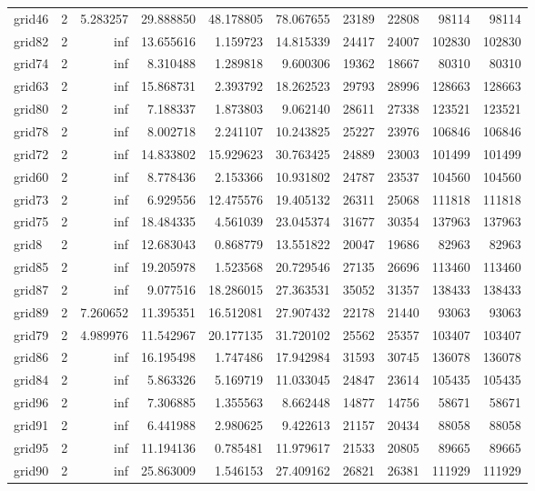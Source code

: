 \begin{longtable}{|l|r|r|r|r|r|r|r|r|r|}
grid46 & 2 & 5.283257 & 29.888850 & 48.178805 & 78.067655 & 23189 & 22808 & 98114 & 98114 \\
grid82 & 2 & inf & 13.655616 & 1.159723 & 14.815339 & 24417 & 24007 & 102830 & 102830 \\
grid74 & 2 & inf & 8.310488 & 1.289818 & 9.600306 & 19362 & 18667 & 80310 & 80310 \\
grid63 & 2 & inf & 15.868731 & 2.393792 & 18.262523 & 29793 & 28996 & 128663 & 128663 \\
grid80 & 2 & inf & 7.188337 & 1.873803 & 9.062140 & 28611 & 27338 & 123521 & 123521 \\
grid78 & 2 & inf & 8.002718 & 2.241107 & 10.243825 & 25227 & 23976 & 106846 & 106846 \\
grid72 & 2 & inf & 14.833802 & 15.929623 & 30.763425 & 24889 & 23003 & 101499 & 101499 \\
grid60 & 2 & inf & 8.778436 & 2.153366 & 10.931802 & 24787 & 23537 & 104560 & 104560 \\
grid73 & 2 & inf & 6.929556 & 12.475576 & 19.405132 & 26311 & 25068 & 111818 & 111818 \\
grid75 & 2 & inf & 18.484335 & 4.561039 & 23.045374 & 31677 & 30354 & 137963 & 137963 \\
grid8 & 2 & inf & 12.683043 & 0.868779 & 13.551822 & 20047 & 19686 & 82963 & 82963 \\
grid85 & 2 & inf & 19.205978 & 1.523568 & 20.729546 & 27135 & 26696 & 113460 & 113460 \\
grid87 & 2 & inf & 9.077516 & 18.286015 & 27.363531 & 35052 & 31357 & 138433 & 138433 \\
grid89 & 2 & 7.260652 & 11.395351 & 16.512081 & 27.907432 & 22178 & 21440 & 93063 & 93063 \\
grid79 & 2 & 4.989976 & 11.542967 & 20.177135 & 31.720102 & 25562 & 25357 & 103407 & 103407 \\
grid86 & 2 & inf & 16.195498 & 1.747486 & 17.942984 & 31593 & 30745 & 136078 & 136078 \\
grid84 & 2 & inf & 5.863326 & 5.169719 & 11.033045 & 24847 & 23614 & 105435 & 105435 \\
grid96 & 2 & inf & 7.306885 & 1.355563 & 8.662448 & 14877 & 14756 & 58671 & 58671 \\
grid91 & 2 & inf & 6.441988 & 2.980625 & 9.422613 & 21157 & 20434 & 88058 & 88058 \\
grid95 & 2 & inf & 11.194136 & 0.785481 & 11.979617 & 21533 & 20805 & 89665 & 89665 \\
grid90 & 2 & inf & 25.863009 & 1.546153 & 27.409162 & 26821 & 26381 & 111929 & 111929 \\

\end{longtable}
